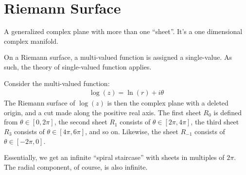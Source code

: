 \documentclass[12pt, english]{book}
\begin{document}
	
	\section{Riemann Surface} \label{Riemann Surface} 
	
	\begin{definition}
		\label{Riemann Surface Informal Definition - Complex}
		A generalized complex plane with more than one ``sheet''. It's a one dimensional complex manifold.
	\end{definition}
	
	On a Riemann surface, a multi-valued function is assigned a single-value. As such, the theory of single-valued function applies.
	
	\begin{example}
		Consider the multi-valued function:
		\begin{align*}
			\log(z) = \ln(r) + i\theta
		\end{align*}
		The Riemann surface of \(\log(z)\) is then the complex plane with a deleted origin, and a cut made along the positive real axis. The first sheet \(R_0\) is defined from \(\theta \in [0, 2\pi]\), the second sheet \(R_1\) consists of \(\theta \in [2\pi, 4\pi]\), the third sheet \(R_3\) consists of \(\theta \in [4\pi, 6\pi]\), and so on. Likewise, the sheet \(R_{-1}\) consists of \(\theta \in [-2\pi, 0]\). 
		
		Essentially, we get an infinite ``spiral staircase'' with sheets in multiples of \(2\pi\). The radial component, of course, is also infinite.
		
		\begin{figure}[H]
			\centering
\end{figure}
\end{example}
\end{document}
